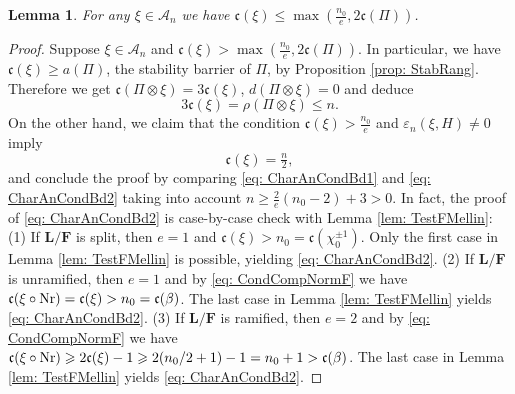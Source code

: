 \documentclass[A4]{amsart}
\def\leq{\leqslant}
\def\geq{\geqslant}
\newtheorem{lemma}      [theorem]{Lemma}
\numberwithin{equation}{section} \everymath{\displaystyle}
\newcommand{\Nr}{{\rm Nr}}
\newcommand{\F}{\mathbf{F}}
\newcommand{\bL}{\mathbf{L}}
\newcommand{\cond}{\mathfrak{c}}
\newcommand{\condL}{\mathfrak{\rho}}
\begin{document}
\begin{lemma} \label{lem: AnAnal}
	For any $\xi \in \mathcal{A}_n$ we have $\cond(\xi) \leq \max \left( \tfrac{n_0}{e}, 2\cond(\Pi) \right)$.
\end{lemma}
\begin{proof}
	Suppose $\xi \in \mathcal{A}_n$ and $\cond(\xi) > \max \left( \tfrac{n_0}{e}, 2\cond(\Pi) \right)$. In particular, we have $\cond(\xi) \geq a(\Pi)$, the stability barrier of $\Pi$, by Proposition \ref{prop: StabRang}. Therefore we get $\cond(\Pi \otimes \xi) = 3\cond(\xi)$, $d(\Pi \otimes \xi) = 0$ and deduce
\begin{equation} \label{eq: CharAnCondBd1} 
	3\cond(\xi) = \condL(\Pi \otimes \xi) \leq n. 
\end{equation}
	On the other hand, we claim that the condition $\cond(\xi) > \tfrac{n_0}{e}$ and $\varepsilon_n(\xi,H) \neq 0$ imply
\begin{equation} \label{eq: CharAnCondBd2} 
	\cond(\xi) = \tfrac{n}{2}, 
\end{equation}
	and conclude the proof by comparing \eqref{eq: CharAnCondBd1} and \eqref{eq: CharAnCondBd2} taking into account $n \geq \tfrac{2}{e}(n_0-2)+3 >0$. In fact, the proof of \eqref{eq: CharAnCondBd2} is case-by-case check with Lemma \ref{lem: TestFMellin}: (1) If $\bL/\F$ is split, then $e=1$ and $\cond(\xi) > n_0 = \cond(\chi_0^{\pm 1})$. Only the first case in Lemma \ref{lem: TestFMellin} is possible, yielding \eqref{eq: CharAnCondBd2}. (2) If $\bL/\F$ is unramified, then $e=1$ and by \eqref{eq: CondCompNormF} we have $\cond(\xi \circ \Nr) = \cond(\xi) > n_0 = \cond(\beta)$. The last case in Lemma \ref{lem: TestFMellin} yields \eqref{eq: CharAnCondBd2}. (3) If $\bL/\F$ is ramified, then $e=2$ and by \eqref{eq: CondCompNormF} we have $\cond(\xi \circ \Nr) \geq 2\cond(\xi)-1 \geq 2(n_0/2+1)-1 = n_0+1 > \cond(\beta)$. The last case in Lemma \ref{lem: TestFMellin} yields \eqref{eq: CharAnCondBd2}.
\end{proof}
\end{document}
